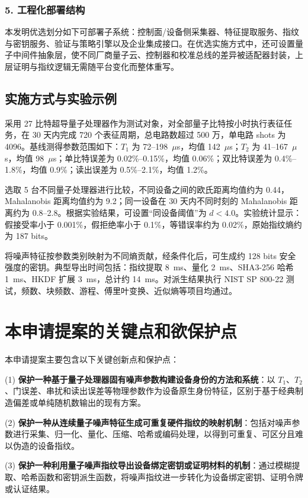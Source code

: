 \documentclass[12pt,a4paper]{article}
\begin{document}
\subsubsection{5. 工程化部署结构}
本发明优选划分如下可部署子系统：控制面/设备侧采集器、特征提取服务、指纹与密钥服务、验证与策略引擎以及企业集成接口。在优选实施方式中，还可设置量子中间件抽象层，使不同厂商量子云、控制器和校准总线的差异被适配器封装，上层证明与指纹逻辑无需随平台变化而整体重写。

\subsection{实施方式与实验示例}

采用 27 比特超导量子处理器作为测试对象，对全部量子比特按小时执行表征任务，在 30 天内完成 720 个表征周期，总电路数超过 500 万，单电路 shots 为 4096。基线测得参数范围如下：$T_1$ 为 72--198~$\mu$s，均值 142~$\mu$s；$T_2$ 为 41--167~$\mu$s，均值 98~$\mu$s；单比特误差为 0.02\%--0.15\%，均值 0.06\%；双比特误差为 0.4\%--1.8\%，均值 0.9\%；读出误差为 0.5\%--2.1\%，均值 1.2\%。

选取 5 台不同量子处理器进行比较，不同设备之间的欧氏距离均值约为 0.44，Mahalanobis 距离均值约为 9.2；同一设备在 30 天内不同时刻的 Mahalanobis 距离约为 0.8--2.8。根据实验结果，可设置“同设备阈值”为 $d < 4.0$。实验统计显示：假接受率小于 0.001\%，假拒绝率小于 0.1\%，等错误率约为 0.02\%，原始指纹熵约为 187 bits。

将噪声特征按参数类别映射为不同熵贡献，经条件化后，可生成约 128 bits 安全强度的密钥。典型导出时间包括：指纹提取 8~ms、量化 2~ms、SHA3-256 哈希 1~ms、HKDF 扩展 3~ms，总计约 14~ms。对派生结果执行 NIST SP 800-22 测试，频数、块频数、游程、傅里叶变换、近似熵等项目均通过。

\section{本申请提案的关键点和欲保护点}

本申请提案主要包含以下关键创新点和保护点：

(1) \textbf{保护一种基于量子处理器固有噪声参数构建设备身份的方法和系统}：以 $T_1$、$T_2$、门误差、串扰和读出误差等物理参数作为设备原生身份特征，区别于基于经典制造偏差或单纯随机数输出的现有方案。

(2) \textbf{保护一种从连续量子噪声特征生成可重复硬件指纹的映射机制}：包括对噪声参数进行采集、归一化、量化、压缩、哈希或编码处理，以得到可重复、可区分且难以伪造的设备指纹。

(3) \textbf{保护一种利用量子噪声指纹导出设备绑定密钥或证明材料的机制}：通过模糊提取、哈希函数和密钥派生函数，将噪声指纹进一步转化为设备绑定密钥、证明令牌或认证结果。
\end{document}
